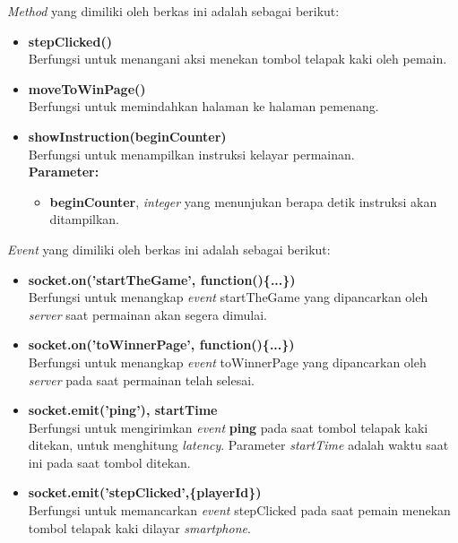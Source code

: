 \begin{enumerate}
\begin{enumerate}
\begin{enumerate}
			\textit{Method} yang dimiliki oleh berkas ini adalah sebagai berikut:
			\begin{itemize}
				\item \textbf{stepClicked()} \\
				Berfungsi untuk menangani aksi menekan tombol telapak kaki oleh pemain.
				
				\item \textbf{moveToWinPage()} \\
				Berfungsi untuk memindahkan halaman ke halaman pemenang.
				
				\item \textbf{showInstruction(beginCounter)} \\
				Berfungsi untuk menampilkan instruksi kelayar permainan.\\
				\textbf{Parameter:}
				\begin{itemize}
					\item \textbf{beginCounter}, \textit{integer} yang menunjukan berapa detik instruksi akan ditampilkan.
				\end{itemize}
			\end{itemize}
			
			\textit{Event} yang dimiliki oleh berkas ini adalah sebagai berikut:
			\begin{itemize}
				\item \textbf{socket.on('startTheGame', function()\{...\})}\\
				Berfungsi untuk menangkap \textit{event} startTheGame yang dipancarkan oleh \textit{server} saat permainan akan segera dimulai.
				
				\item \textbf{socket.on('toWinnerPage', function()\{...\})}\\
				Berfungsi untuk menangkap \textit{event} toWinnerPage yang dipancarkan oleh \textit{server} pada saat permainan telah selesai.
				
				\item \textbf{socket.emit('ping'), startTime} \\ Berfungsi untuk mengirimkan \textit{event} \textbf{ping} pada saat tombol telapak kaki ditekan, untuk menghitung \textit{latency}. Parameter \textit{startTime} adalah waktu saat ini pada saat tombol ditekan.
				
				\item \textbf{socket.emit('stepClicked',\{playerId\})} \\
				Berfungsi untuk memancarkan \textit{event} stepClicked pada saat pemain menekan tombol telapak kaki dilayar \textit{smartphone}.
			\end{itemize}
			

\end{enumerate}
\end{enumerate}
\end{enumerate}

